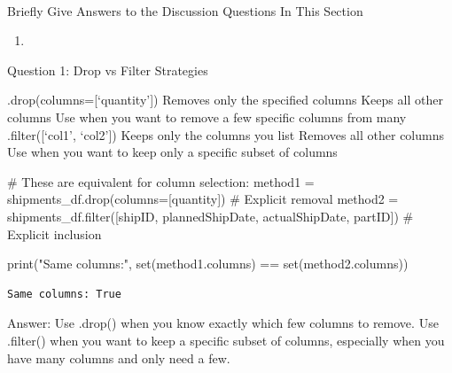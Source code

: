 \documentclass[
  letterpaper,
  DIV=11,
  numbers=noendperiod]{scrartcl}
\makeatletter
\let\oldparagraph\paragraph
\renewcommand{\paragraph}{
    \@ifstar
      \xxxParagraphStar
      \xxxParagraphNoStar
  }
\newcommand{\xxxParagraphStar}[1]{\oldparagraph*{#1}\mbox{}}
\newcommand{\xxxParagraphNoStar}[1]{\oldparagraph{#1}\mbox{}}
\newenvironment{Shaded}{\begin{snugshade}}{\end{snugshade}}
\newcommand{\BuiltInTok}[1]{\textcolor[rgb]{0.00,0.23,0.31}{#1}}
\newcommand{\CommentTok}[1]{\textcolor[rgb]{0.37,0.37,0.37}{#1}}
\newcommand{\NormalTok}[1]{\textcolor[rgb]{0.00,0.23,0.31}{#1}}
\newcommand{\OperatorTok}[1]{\textcolor[rgb]{0.37,0.37,0.37}{#1}}
\newcommand{\StringTok}[1]{\textcolor[rgb]{0.13,0.47,0.30}{#1}}
\providecommand{\tightlist}{%
  \setlength{\itemsep}{0pt}\setlength{\parskip}{0pt}}
\makeatother
\begin{document}
\paragraph{Briefly Give Answers to the Discussion Questions In This
Section}\label{briefly-give-answers-to-the-discussion-questions-in-this-section-2}

\begin{enumerate}
\def\labelenumi{\arabic{enumi}.}
\tightlist
\item
\end{enumerate}

Question 1: Drop vs Filter Strategies

.drop(columns={[}`quantity'{]}) Removes only the specified columns Keeps
all other columns Use when you want to remove a few specific columns
from many .filter({[}`col1', `col2'{]}) Keeps only the columns you list
Removes all other columns Use when you want to keep only a specific
subset of columns

\begin{Shaded}
\begin{Highlighting}[]
\CommentTok{\# These are equivalent for column selection:}
\NormalTok{method1 }\OperatorTok{=}\NormalTok{ shipments\_df.drop(columns}\OperatorTok{=}\NormalTok{[}\StringTok{\textquotesingle{}quantity\textquotesingle{}}\NormalTok{])  }\CommentTok{\# Explicit removal}
\NormalTok{method2 }\OperatorTok{=}\NormalTok{ shipments\_df.}\BuiltInTok{filter}\NormalTok{([}\StringTok{\textquotesingle{}shipID\textquotesingle{}}\NormalTok{, }\StringTok{\textquotesingle{}plannedShipDate\textquotesingle{}}\NormalTok{, }\StringTok{\textquotesingle{}actualShipDate\textquotesingle{}}\NormalTok{, }\StringTok{\textquotesingle{}partID\textquotesingle{}}\NormalTok{])  }\CommentTok{\# Explicit inclusion}

\BuiltInTok{print}\NormalTok{(}\StringTok{"Same columns:"}\NormalTok{, }\BuiltInTok{set}\NormalTok{(method1.columns) }\OperatorTok{==} \BuiltInTok{set}\NormalTok{(method2.columns))}
\end{Highlighting}
\end{Shaded}

\begin{verbatim}
Same columns: True
\end{verbatim}

Answer: Use .drop() when you know exactly which few columns to remove.
Use .filter() when you want to keep a specific subset of columns,
especially when you have many columns and only need a few.
\end{document}
